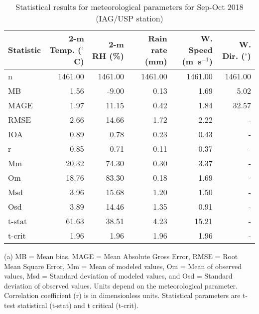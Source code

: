 \begin{table}
\centering
\begin{threeparttable}
\caption{Statistical results for meteorological parameters for Sep-Oct 2018 (IAG/USP station)}
\label{tab:stats_iag}
\begin{tabular}{lrrrrr}
\toprule
Statistic\tnote{(a)} & 2-m Temp. ($^{\circ}$C) & 2-m RH (\%) & Rain rate (mm)  & W. Speed (m~s$^{-1}$) & W. Dir. ($^{\circ}$)  \\
\midrule
n      &  1461.00 &  1461.00 &  1461.00 &  1461.00 &  1461.00 \\
MB     &     1.56 &    -9.00 &     0.13 &     1.69 &     5.02 \\
MAGE   &     1.97 &    11.15 &     0.42 &     1.84 &    32.57 \\
RMSE   &     2.66 &    14.66 &     1.72 &     2.22 &        - \\
IOA    &     0.89 &     0.78 &     0.23 &     0.43 &        - \\
r      &     0.85 &     0.71 &     0.11 &     0.37 &        - \\
Mm     &    20.32 &    74.30 &     0.30 &     3.37 &        - \\
Om     &    18.76 &    83.30 &     0.18 &     1.69 &        - \\
Msd    &     3.96 &    15.68 &     1.20 &     1.50 &        - \\
Osd    &     3.89 &    14.46 &     1.35 &     0.91 &        - \\
t-stat &    61.63 &    38.51 &     4.23 &    15.21 &        - \\
t-crit &     1.96 &     1.96 &     1.96 &     1.96 &        - \\
\bottomrule
\end{tabular}
\begin{tablenotes}
{\scriptsize
	\item[(a)] MB = Mean bias, MAGE = Mean Absolute Gross Error, RMSE = Root Mean Square Error, Mm = Mean of modeled values, Om = Mean of observed values, Msd = Standard deviation of modeled values, and Osd = Standard deviation of observed values. Units depend on the meteorological parameter. Correlation coefficient (r) is in dimensionless units. Statistical parameters are t-test statistical (t-stat) and t critical (t-crit).}
\end{tablenotes}
\end{threeparttable}
\end{table}

